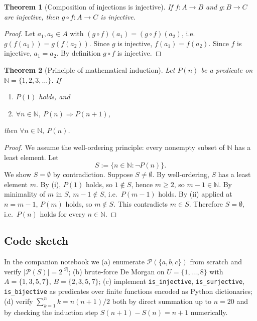 \documentclass[11pt]{article}
\newtheorem{theorem}{Theorem}[section]
\theoremstyle{remark}
\begin{document}
\begin{theorem}[Composition of injections is injective]\label{thm:compinj}
If $f : A \to B$ and $g : B \to C$ are injective, then $g \circ f : A \to C$ is injective.
\end{theorem}

\begin{proof}
Let $a_1, a_2 \in A$ with $(g \circ f)(a_1) = (g \circ f)(a_2)$, i.e.\ $g(f(a_1)) = g(f(a_2))$. Since $g$ is injective, $f(a_1) = f(a_2)$. Since $f$ is injective, $a_1 = a_2$. By definition $g \circ f$ is injective.
\end{proof}

\begin{theorem}[Principle of mathematical induction]\label{thm:induction}
Let $P(n)$ be a predicate on $\mathbb{N} = \{1, 2, 3, \ldots\}$. If
\begin{enumerate}
  \item[\textup{(i)}] $P(1)$ holds, and
  \item[\textup{(ii)}] $\forall n \in \mathbb{N},\ P(n) \Rightarrow P(n+1)$,
\end{enumerate}
then $\forall n \in \mathbb{N},\ P(n)$.
\end{theorem}

\begin{proof}
We assume the well-ordering principle: every nonempty subset of $\mathbb{N}$ has a least element. Let
\[
S := \{n \in \mathbb{N} : \neg P(n)\}.
\]
We show $S = \emptyset$ by contradiction. Suppose $S \neq \emptyset$. By well-ordering, $S$ has a least element $m$. By (i), $P(1)$ holds, so $1 \notin S$, hence $m \geq 2$, so $m - 1 \in \mathbb{N}$. By minimality of $m$ in $S$, $m - 1 \notin S$, i.e.\ $P(m-1)$ holds. By (ii) applied at $n = m - 1$, $P(m)$ holds, so $m \notin S$. This contradicts $m \in S$. Therefore $S = \emptyset$, i.e.\ $P(n)$ holds for every $n \in \mathbb{N}$.
\end{proof}

\subsection*{Code sketch}

In the companion notebook we (a) enumerate $\mathcal{P}(\{a,b,c\})$ from scratch and verify $|\mathcal{P}(S)| = 2^{|S|}$; (b) brute-force De Morgan on $U = \{1, \ldots, 8\}$ with $A = \{1,3,5,7\}$, $B = \{2,3,5,7\}$; (c) implement \texttt{is\_injective}, \texttt{is\_surjective}, \texttt{is\_bijective} as predicates over finite functions encoded as Python dictionaries; (d) verify $\sum_{k=1}^{n} k = n(n+1)/2$ both by direct summation up to $n=20$ and by checking the induction step $S(n+1) - S(n) = n+1$ numerically.
\end{document}
